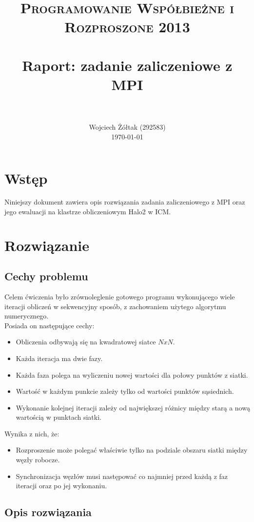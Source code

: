 \documentclass[paper=a4, fontsize=11pt]{scrartcl}	%
\title{
	\usefont{OT1}{bch}{b}{n}
	\normalfont \normalsize \textsc{Programowanie Współbieżne i Rozproszone 2013} \\ [25pt]
	\horrule{0.5pt} \\[0.4cm]
	\huge Raport: zadanie zaliczeniowe z MPI \\
	\horrule{2pt} \\[0.5cm]
}
\author{
	\normalfont \normalsize
        Wojciech Żółtak (292583) \\[-3pt] \normalsize
        \today
}
\date{}
\numberwithin{equation}{section}		%
\numberwithin{figure}{section}			%
\numberwithin{table}{section}				%
\begin{document}

\maketitle

\section{Wstęp}
Niniejszy dokument zawiera opis rozwiązania zadania zaliczeniowego z MPI oraz
jego ewaluacji na klastrze obliczeniowym Halo2 w ICM.


\section{Rozwiązanie}

\subsection{Cechy problemu}
Celem ćwiczenia było zrównoleglenie gotowego programu wykonującego wiele
iteracji obliczeń w sekwencyjny sposób, z zachowaniem użytego algorytmu
numerycznego.\\

Posiada on następujące cechy:
\begin{itemize}
  \item{Obliczenia odbywają się na kwadratowej siatce $NxN$.}
  \item{Każda iteracja ma dwie fazy.}
  \item{Każda faza polega na wyliczeniu nowej wartości dla połowy punktów z
        siatki.}
  \item{Wartość w każdym punkcie zależy tylko od wartości punktów sąsiednich.}
  \item{Wykonanie kolejnej iteracji zależy od największej różnicy między starą a
        nową wartością w punktach siatki.}
\end{itemize}

Wynika z nich, że:
\begin{itemize}
  \item{Rozproszenie może polegać właściwie tylko na podziale obszaru siatki
        między węzły robocze.}
  \item{Synchronizacja węzłów musi następować co najmniej przed każdą z faz
        iteracji oraz po jej wykonaniu.}
\end{itemize}


\subsection{Opis rozwiązania}
\end{document}
